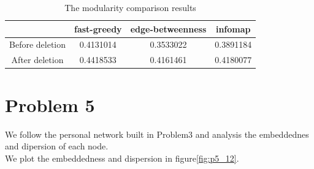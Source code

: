 \documentclass{article}
\begin{document}
\begin {table}[htbp]
\caption{The modularity comparison results}
\begin{adjustbox}{center}
\label{tb:p4}
\begin{tabular}{|c|c|c|c|}
\hline
&fast-greedy &edge-betweenness &infomap\\
\hline
Before deletion&0.4131014&0.3533022&0.3891184\\
\hline
After deletion&0.4418533& 0.4161461& 0.4180077\\
\hline
\end{tabular}
\end{adjustbox}
\end{table}
\newpage
\section{Problem 5}
We follow the personal network built in Problem3 and analysis the embeddednes and dipersion of each node.\\
We plot the embeddedness and dispersion in figure\ref{fig:p5_12}.\\
\end{document}
